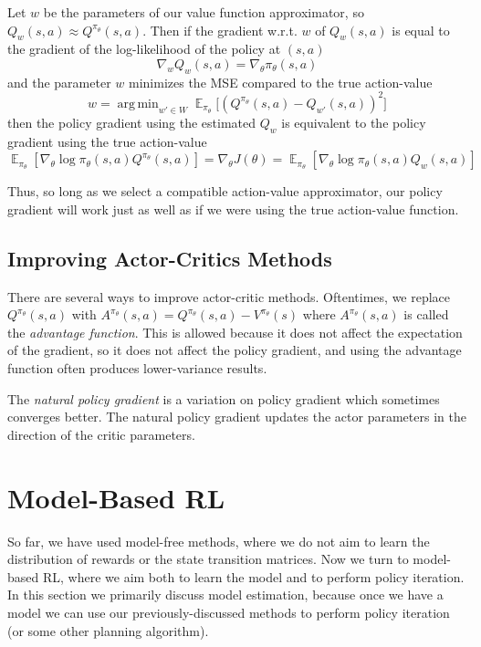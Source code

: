 \documentclass{article}
\DeclareMathOperator{\argmin}{arg\,min}
\DeclareMathOperator{\EX}{\mathbb{E}}
\newcommand{\ita}{\textit}
\begin{document}
Let $w$ be the parameters of our value function approximator, so $Q_w(s, a)\approx Q^{\pi_\theta}(s, a)$. Then if the gradient w.r.t. $w$ of $Q_w(s, a)$ is equal to the gradient of the log-likelihood of the policy at $(s, a)$
\begin{equation}
\nabla_w Q_w(s, a) = \nabla_\theta \pi_\theta(s, a)
\end{equation}
and the parameter $w$ minimizes the MSE compared to the true action-value
\begin{equation}\label{eq:w_minimizes_mse}
w = \argmin_{w'\in W} \EX_{\pi_\theta}\big[(Q^{\pi_\theta}(s, a) - Q_{w'}(s, a))^2\big]
\end{equation}
then the policy gradient using the estimated $Q_w$ is equivalent to the policy gradient using the true action-value
\begin{equation}\label{eq:policy_gradient_equivalence}
\EX_{\pi_\theta}[\nabla_\theta\log \pi_\theta(s, a)Q^{\pi_\theta}(s, a)]= \nabla_\theta J(\theta)=\EX_{\pi_\theta}[\nabla_\theta\log \pi_\theta(s, a)Q_w(s, a)]
\end{equation}

Thus, so long as we select a compatible action-value approximator, our policy gradient will work just as well as if we were using the true action-value function.

\subsection{Improving Actor-Critics Methods}

There are several ways to improve actor-critic methods. Oftentimes, we replace $Q^{\pi_\theta}(s, a)$ with $A^{\pi_\theta}(s, a)=Q^{\pi_\theta}(s, a) - V^{\pi_\theta}(s)$ where $A^{\pi_\theta}(s, a)$ is called the \ita{advantage function}. This is allowed because it does not affect the expectation of the gradient, so it does not affect the policy gradient, and using the advantage function often produces lower-variance results.

The \ita{natural policy gradient} is a variation on policy gradient which sometimes converges better. The natural policy gradient updates the actor parameters in the direction of the critic parameters.

\section{Model-Based RL}

So far, we have used model-free methods, where we do not aim to learn the distribution of rewards or the state transition matrices. Now we turn to model-based RL, where we aim both to learn the model and to perform policy iteration. In this section we primarily discuss model estimation, because once we have a model we can use our previously-discussed methods to perform policy iteration (or some other planning algorithm).
\end{document}
